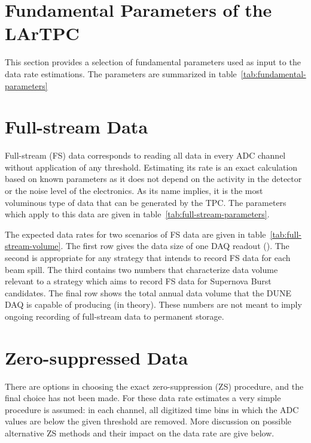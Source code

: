 \section{Fundamental Parameters of the LArTPC}

This section provides a selection of fundamental parameters used as
input to the data rate estimations.
The parameters are summarized in
table~\ref{tab:fundamental-parameters}



\section{Full-stream Data}

Full-stream (FS) data corresponds to reading all data in every ADC channel without application of any threshold.
Estimating its rate is an exact calculation based on known parameters as it does not depend on
the activity in the detector or the noise level of the electronics.
As its name implies, it is the most voluminous type of data that can be generated by the TPC.
The parameters which apply to this data are given in table~\ref{tab:full-stream-parameters}.



The expected data rates for two scenarios of FS data are given
in table~\ref{tab:full-stream-volume}.
The first row gives the data size of one DAQ readout (\daqreadouttime).
The second is appropriate for any strategy that intends to record FS
data for each beam spill.
The third contains two numbers that characterize data volume relevant to a strategy which aims to record FS data
for Supernova Burst candidates.
The final row  shows the total annual data volume that the DUNE DAQ is capable of producing (in theory).
These numbers are not meant to imply ongoing recording of full-stream
data to permanent storage.



\section{Zero-suppressed Data}

There are options in choosing the exact zero-suppression (ZS) procedure,
and the final choice has not been made.
For these data rate estimates a very simple procedure is assumed: in each
channel, all digitized time bins in which the ADC values are below
the given threshold are removed.
More discussion on possible alternative ZS methods and their impact on
the data rate are give below.

